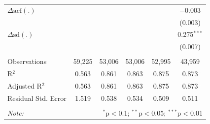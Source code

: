 \begin{tabular}{@{\extracolsep{5pt}}lccccc}
  $\Delta \text{acf}(.)$ &  &  &  &  & $-$0.003 \\ 
  &  &  &  &  & (0.003) \\ 
  $\Delta \text{sd}(.)$ &  &  &  &  & 0.275$^{***}$ \\ 
  &  &  &  &  & (0.007) \\ 
 \hline \\[-1.8ex] 
Observations & 59,225 & 53,006 & 53,006 & 52,995 & 43,959 \\ 
R$^{2}$ & 0.563 & 0.861 & 0.863 & 0.875 & 0.873 \\ 
Adjusted R$^{2}$ & 0.563 & 0.861 & 0.863 & 0.875 & 0.873 \\ 
Residual Std. Error & 1.519 & 0.538 & 0.534 & 0.509 & 0.511 \\ 
\hline 
\hline \\[-1.8ex] 
\textit{Note:}  & \multicolumn{5}{r}{$^{*}$p$<$0.1; $^{**}$p$<$0.05; $^{***}$p$<$0.01} \\ 
\end{tabular} 
